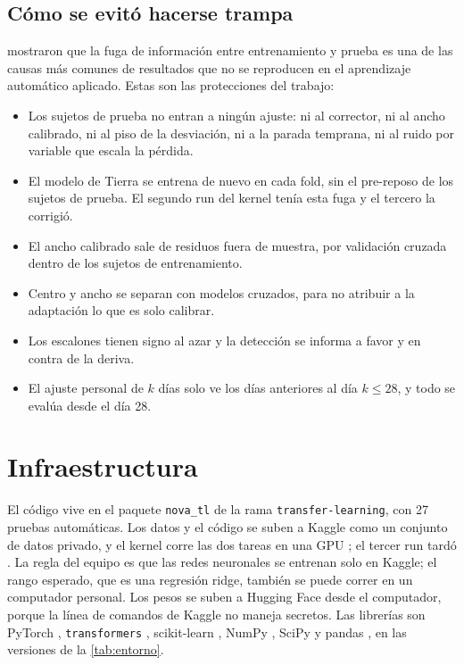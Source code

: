 \subsection{Cómo se evitó hacerse trampa}

\textcite{kapoor2023} mostraron que la fuga de información entre entrenamiento y prueba es una de las causas más
comunes de resultados que no se reproducen en el aprendizaje automático aplicado. Estas son las protecciones del
trabajo:
\begin{itemize}
\item Los sujetos de prueba no entran a ningún ajuste: ni al corrector, ni al ancho calibrado, ni al piso de la
  desviación, ni a la parada temprana, ni al ruido por variable que escala la pérdida.
\item El modelo de Tierra se entrena de nuevo en cada fold, sin el pre-reposo de los sujetos de prueba. El segundo run
  del kernel tenía esta fuga y el tercero la corrigió.
\item El ancho calibrado sale de residuos fuera de muestra, por validación cruzada dentro de los sujetos de
  entrenamiento.
\item Centro y ancho se separan con modelos cruzados, para no atribuir a la adaptación lo que es solo calibrar.
\item Los escalones tienen signo al azar y la detección se informa a favor y en contra de la deriva.
\item El ajuste personal de $k$ días solo ve los días anteriores al día $k \le 28$, y todo se evalúa desde el día 28.
\end{itemize}

\section{Infraestructura}

El código vive en el paquete \texttt{nova\_tl} de la rama \texttt{transfer-learning}, con 27 pruebas automáticas. Los
datos y el código se suben a Kaggle como un conjunto de datos privado, y el kernel corre las dos tareas en una GPU
; el tercer run tardó . La regla del equipo es que las redes neuronales
se entrenan solo en Kaggle; el rango esperado, que es una regresión ridge, también se puede correr en un computador
personal. Los pesos se suben a Hugging Face desde el computador, porque la línea de comandos de Kaggle no maneja
secretos. Las librerías son PyTorch \parencite{paszke2019}, \texttt{transformers} \parencite{wolf2020},
scikit-learn \parencite{pedregosa2011}, NumPy \parencite{harris2020}, SciPy \parencite{virtanen2020} y pandas
\parencite{mckinney2010}, en las versiones de la \cref{tab:entorno}.

\begin{table}[htbp]
\caption[Entorno del tercer run]{Entorno del tercer run del kernel, tal como lo registró \texttt{metricas.json}.}
\label{tab:entorno}
\small

\end{table}
